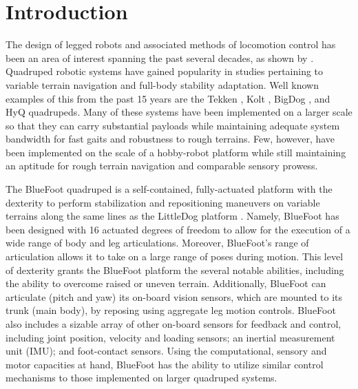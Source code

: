 \chapter{Introduction}
	\label{ch::introduction}

		The design of legged robots and associated methods of locomotion control has been an area of interest spanning the past several decades, as shown by \cite{McGhee1965,Hodgins1991,Altendorfer2001,Kolter2008,Wieber2015}. Quadruped robotic systems have gained popularity in studies pertaining to variable terrain navigation and full-body stability adaptation. Well known examples of this from the past 15 years are the Tekken \cite{Fukuoka2003}, Kolt \cite{Estremera2006}, BigDog \cite{BigDog2008}, and HyQ \cite{Semini2010_PHD} quadrupeds. Many of these systems have been implemented on a larger scale so that they can carry substantial payloads while maintaining adequate system bandwidth for fast gaits and robustness to rough terrains. Few, however, have been implemented on the scale of a hobby-robot platform while still maintaining an aptitude for rough terrain navigation and comparable sensory prowess.

		The BlueFoot quadruped is a self-contained, fully-actuated platform with the dexterity to perform stabilization and repositioning maneuvers on variable terrains along the same lines as the LittleDog platform \cite{Rebula2007}. Namely, BlueFoot has been designed with 16 actuated degrees of freedom to allow for the execution of a wide range of body and leg articulations. Moreover, BlueFoot's range of articulation allows it to take on a large range of poses during motion. This level of dexterity grants the BlueFoot platform the several notable abilities, including the ability to overcome raised or uneven terrain. Additionally, BlueFoot can articulate (\IE pitch and yaw) its on-board vision sensors, which are mounted to its trunk (main body), by reposing using aggregate leg motion controls. BlueFoot also includes a sizable array of other on-board sensors for feedback and control, including joint position, velocity and loading sensors; an inertial measurement unit (IMU); and foot-contact sensors. Using the computational, sensory and motor capacities at hand, BlueFoot has the ability to utilize similar control mechanisms to those implemented on larger quadruped systems. 


